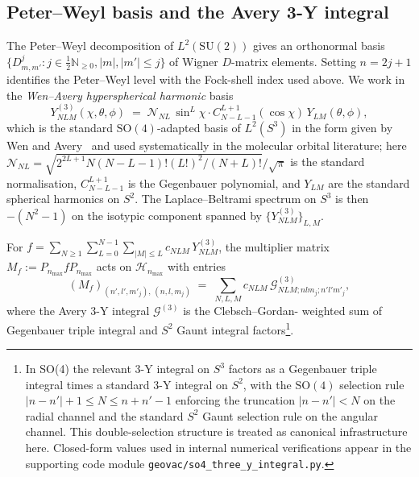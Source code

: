 \documentclass[11pt,a4paper]{article}
\theoremstyle{plain}
\theoremstyle{definition}
\newcommand{\nmax}{n_{\max}}
\newcommand{\sthree}{S^{3}}
\newcommand{\Hilb}{\mathcal{H}}
\newcommand{\N}{\mathbb{N}}
\newcommand{\SU}{\mathrm{SU}}
\newcommand{\SO}{\mathrm{SO}}
\newcommand{\Mat}{M}
\begin{document}
\subsection{Peter--Weyl basis and the Avery 3-Y integral}
\label{sec:peter_weyl}

The Peter--Weyl decomposition of $L^2(\SU(2))$ gives an orthonormal
basis $\{D^j_{m, m'} : j \in \tfrac{1}{2}\N_{\ge 0}, |m|, |m'| \le j\}$
of Wigner $D$-matrix elements. Setting $n = 2j + 1$ identifies the
Peter--Weyl level with the Fock-shell index used above. We work in the
\emph{Wen--Avery hyperspherical harmonic} basis
\begin{equation}\label{eq:avery_y3}
   Y^{(3)}_{NLM}(\chi, \theta, \phi)
   \;=\; \mathcal{N}_{NL}\,\sin^L \chi \cdot
   C^{L+1}_{N - L - 1}(\cos \chi)\,Y_{LM}(\theta, \phi),
\end{equation}
which is the standard $\SO(4)$-adapted basis of $L^2(\sthree)$
in the form given by Wen and Avery~\cite{avery_wen_avery1986} and used systematically
in the molecular orbital literature; here
$\mathcal{N}_{NL} = \sqrt{2^{2L+1} N (N-L-1)! (L!)^2 / (N+L)!}/\sqrt{\pi}$
is the standard normalisation, $C^{L+1}_{N-L-1}$ is the Gegenbauer
polynomial, and $Y_{LM}$ are the standard spherical harmonics on
$S^2$. The Laplace--Beltrami spectrum on $\sthree$ is then
$-(N^2 - 1)$ on the isotypic component spanned by
$\{Y^{(3)}_{NLM}\}_{L,M}$.

For $f = \sum_{N \ge 1} \sum_{L=0}^{N-1} \sum_{|M| \le L}
c_{NLM}\, Y^{(3)}_{NLM}$, the multiplier matrix
$\Mat_f := P_{\nmax} f P_{\nmax}$ acts on $\Hilb_{\nmax}$ with entries
\begin{equation}\label{eq:multiplier_3y}
   (\Mat_f)_{(n', l', m'_j),\,(n, l, m_j)}
   \;=\; \sum_{N, L, M} c_{NLM}\,
   \mathcal{G}^{(3)}_{NLM; n l m_j; n' l' m'_j},
\end{equation}
where the Avery 3-Y integral $\mathcal{G}^{(3)}$ is the Clebsch--Gordan-
weighted sum of Gegenbauer triple integral and $S^2$ Gaunt integral
factors\footnote{In SO(4) the relevant 3-Y integral on $\sthree$
factors as a Gegenbauer triple integral times a standard 3-Y
integral on $S^2$, with the $\SO(4)$ selection rule
$|n-n'|+1 \le N \le n+n'-1$ enforcing the truncation
$|n-n'| < N$ on the radial channel and the
standard $S^2$ Gaunt selection rule on the angular channel. This
double-selection structure is treated as canonical infrastructure here. Closed-form values used in
internal numerical verifications appear in the supporting code module
\texttt{geovac/so4\_three\_y\_integral.py}.}.
\end{document}
